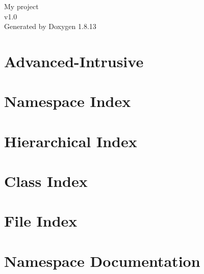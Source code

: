 \documentclass[twoside]{book}
\newcommand{\+}{\discretionary{\mbox{\scriptsize$\hookleftarrow$}}{}{}}
\newcommand{\clearemptydoublepage}{%
  \newpage{\pagestyle{empty}\cleardoublepage}%
}
\begin{document}
\hypersetup{pageanchor=false,
             bookmarksnumbered=true,
             pdfencoding=unicode
            }
\begin{titlepage}
\vspace*{7cm}
\begin{center}%
{\Large My project \\[1ex]\large v1.\+0 }\\
\vspace*{1cm}
{\large Generated by Doxygen 1.8.13}\\
\end{center}
\end{titlepage}
\clearemptydoublepage
{}
\tableofcontents
\clearemptydoublepage
{}
\hypersetup{pageanchor=true}

\chapter{Advanced-\/\+Intrusive}
\label{md__home_hari_GSOC_boost_1_67_0_boost_Advanced-Intrusive-master_README}

\chapter{Namespace Index}

\chapter{Hierarchical Index}

\chapter{Class Index}

\chapter{File Index}

\chapter{Namespace Documentation}



\end{document}
